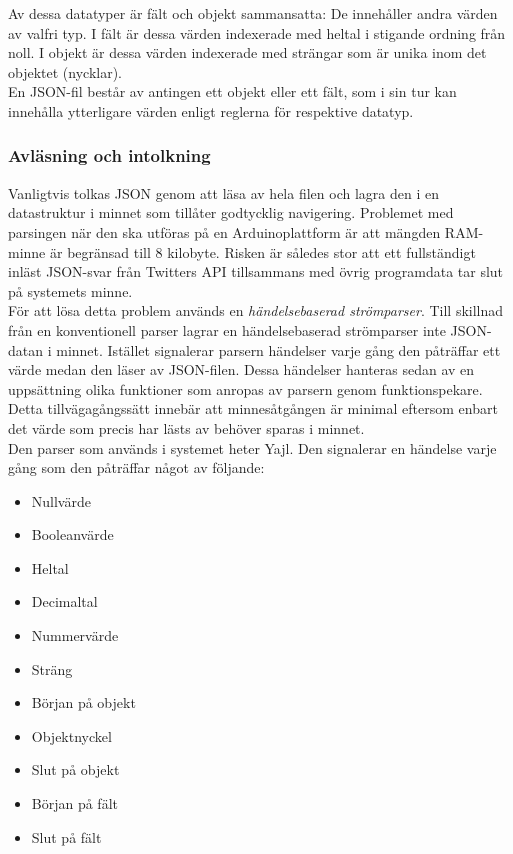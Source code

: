 \documentclass[a4paper,11pt]{article}
\begin{document}
Av dessa datatyper är fält och objekt sammansatta: De innehåller andra värden av valfri typ. I fält är dessa värden indexerade med heltal i stigande ordning från noll. I objekt är dessa värden indexerade med strängar som är unika inom det objektet (nycklar). \\

En JSON-fil består av antingen ett objekt eller ett fält, som i sin tur kan innehålla ytterligare värden enligt reglerna för respektive datatyp. \\

\subsubsection{Avläsning och intolkning}
Vanligtvis tolkas JSON genom att läsa av hela filen och lagra den i en datastruktur i minnet som tillåter godtycklig navigering. Problemet med parsingen när den ska utföras på en Arduinoplattform är att mängden RAM-minne är begränsad till 8 kilobyte. Risken är således stor att ett fullständigt inläst JSON-svar från Twitters API tillsammans med övrig programdata tar slut på systemets minne. \\

För att lösa detta problem används en {\it händelsebaserad strömparser}. Till skillnad från en konventionell parser lagrar en händelsebaserad strömparser inte JSON-datan i minnet. Istället signalerar parsern händelser varje gång den påträffar ett värde medan den läser av JSON-filen. Dessa händelser hanteras sedan av en uppsättning olika funktioner som anropas av parsern genom funktionspekare. Detta tillvägagångssätt innebär att minnesåtgången är minimal eftersom enbart det värde som precis har lästs av behöver sparas i minnet. \\

Den parser som används i systemet heter Yajl. Den signalerar en händelse varje gång som den påträffar något av följande:

	\begin{itemize}
    	\item Nullvärde
    	\item Booleanvärde
    	\item Heltal
    	\item Decimaltal
    	\item Nummervärde
    	\item Sträng
    	\item Början på objekt
    	\item Objektnyckel
    	\item Slut på objekt
    	\item Början på fält
    	\item Slut på fält
	\end{itemize}
	
\end{document}
